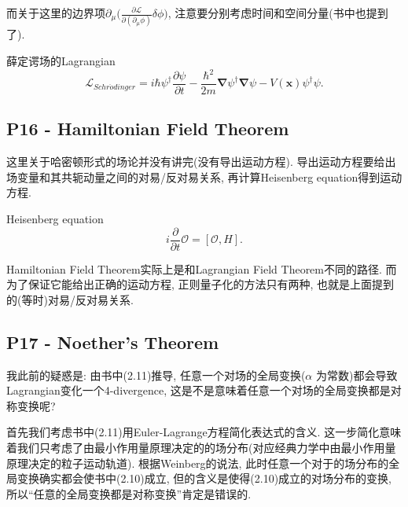 而关于这里的边界项$\partial_\mu \bigl(\frac{\partial \mathcal{L}}{\partial(\partial_\mu \phi)}\delta \phi \bigr)$, 注意要分别考虑时间和空间分量(书中也提到了).
\begin{mybox}{薛定谔场的Lagrangian}
  \begin{equation}
    \mathcal{L}_{Schr\ddot{o}dinger} = i\hbar\psi^\dagger\frac{\partial \psi}{\partial t} - \frac{\hbar^2}{2m}\bm{\nabla}\psi^\dagger\bm{\nabla}\psi - V(\mathbf x)\psi^\dagger\psi.
  \end{equation}
\end{mybox}

\subsection{P16 - Hamiltonian Field Theorem}

这里关于哈密顿形式的场论并没有讲完(没有导出运动方程).
导出运动方程要给出场变量和其共轭动量之间的对易/反对易关系, 再计算Heisenberg equation得到运动方程.
\begin{mybox}{Heisenberg equation}
  \begin{equation}
    i\frac{\partial}{\partial t}\mathcal{O} = [\mathcal{O}, H].
  \end{equation}
\end{mybox}


Hamiltonian Field Theorem实际上是和Lagrangian Field Theorem不同的路径.
而为了保证它能给出正确的运动方程, 正则量子化的方法只有两种, 也就是上面提到的(等时)对易/反对易关系.

\subsection{P17 - Noether's Theorem}

我此前的疑惑是: 由书中(2.11)推导, 任意一个对场的全局变换($\alpha$ 为常数)都会导致Lagrangian变化一个4-divergence, 这是不是意味着任意一个对场的全局变换都是对称变换呢?

首先我们考虑书中(2.11)用Euler-Lagrange方程简化表达式的含义.
这一步简化意味着我们只考虑了由最小作用量原理决定的的场分布(对应经典力学中由最小作用量原理决定的粒子运动轨道).
根据Weinberg的说法, 此时任意一个对于的场分布的全局变换确实都会使书中(2.10)成立, 但的含义是使得(2.10)成立的对场分布的变换, 所以“任意的全局变换都是对称变换”肯定是错误的.


